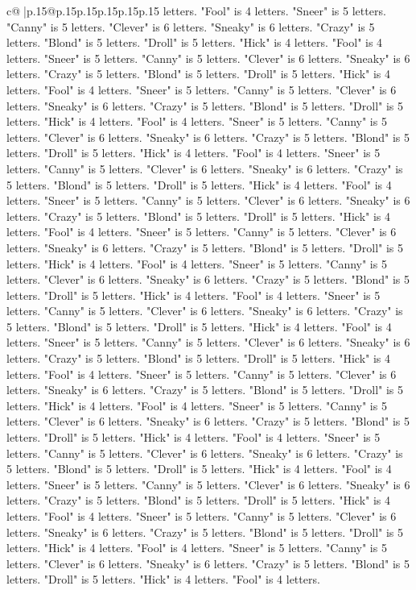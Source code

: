 \documentclass{article}
\begin{document}
{\begin{supertabular}{c@{$\;$}|p{.15\linewidth}@{}p{.15\linewidth}p{.15\linewidth}p{.15\linewidth}p{.15\linewidth}p{.15\linewidth}}
{{{letters. "Fool" is 4 letters. "Sneer" is 5 letters. "Canny" is 5 letters. "Clever" is 6 letters. "Sneaky" is 6 letters. "Crazy" is 5 letters. "Blond" is 5 letters. "Droll" is 5 letters. "Hick" is 4 letters. "Fool" is 4 letters. "Sneer" is 5 letters. "Canny" is 5 letters. "Clever" is 6 letters. "Sneaky" is 6 letters. "Crazy" is 5 letters. "Blond" is 5 letters. "Droll" is 5 letters. "Hick" is 4 letters. "Fool" is 4 letters. "Sneer" is 5 letters. "Canny" is 5 letters. "Clever" is 6 letters. "Sneaky" is 6 letters. "Crazy" is 5 letters. "Blond" is 5 letters. "Droll" is 5 letters. "Hick" is 4 letters. "Fool" is 4 letters. "Sneer" is 5 letters. "Canny" is 5 letters. "Clever" is 6 letters. "Sneaky" is 6 letters. "Crazy" is 5 letters. "Blond" is 5 letters. "Droll" is 5 letters. "Hick" is 4 letters. "Fool" is 4 letters. "Sneer" is 5 letters. "Canny" is 5 letters. "Clever" is 6 letters. "Sneaky" is 6 letters. "Crazy" is 5 letters. "Blond" is 5 letters. "Droll" is 5 letters. "Hick" is 4 letters. "Fool" is 4 letters. "Sneer" is 5 letters. "Canny" is 5 letters. "Clever" is 6 letters. "Sneaky" is 6 letters. "Crazy" is 5 letters. "Blond" is 5 letters. "Droll" is 5 letters. "Hick" is 4 letters. "Fool" is 4 letters. "Sneer" is 5 letters. "Canny" is 5 letters. "Clever" is 6 letters. "Sneaky" is 6 letters. "Crazy" is 5 letters. "Blond" is 5 letters. "Droll" is 5 letters. "Hick" is 4 letters. "Fool" is 4 letters. "Sneer" is 5 letters. "Canny" is 5 letters. "Clever" is 6 letters. "Sneaky" is 6 letters. "Crazy" is 5 letters. "Blond" is 5 letters. "Droll" is 5 letters. "Hick" is 4 letters. "Fool" is 4 letters. "Sneer" is 5 letters. "Canny" is 5 letters. "Clever" is 6 letters. "Sneaky" is 6 letters. "Crazy" is 5 letters. "Blond" is 5 letters. "Droll" is 5 letters. "Hick" is 4 letters. "Fool" is 4 letters. "Sneer" is 5 letters. "Canny" is 5 letters. "Clever" is 6 letters. "Sneaky" is 6 letters. "Crazy" is 5 letters. "Blond" is 5 letters. "Droll" is 5 letters. "Hick" is 4 letters. "Fool" is 4 letters. "Sneer" is 5 letters. "Canny" is 5 letters. "Clever" is 6 letters. "Sneaky" is 6 letters. "Crazy" is 5 letters. "Blond" is 5 letters. "Droll" is 5 letters. "Hick" is 4 letters. "Fool" is 4 letters. "Sneer" is 5 letters. "Canny" is 5 letters. "Clever" is 6 letters. "Sneaky" is 6 letters. "Crazy" is 5 letters. "Blond" is 5 letters. "Droll" is 5 letters. "Hick" is 4 letters. "Fool" is 4 letters. "Sneer" is 5 letters. "Canny" is 5 letters. "Clever" is 6 letters. "Sneaky" is 6 letters. "Crazy" is 5 letters. "Blond" is 5 letters. "Droll" is 5 letters. "Hick" is 4 letters. "Fool" is 4 letters. "Sneer" is 5 letters. "Canny" is 5 letters. "Clever" is 6 letters. "Sneaky" is 6 letters. "Crazy" is 5 letters. "Blond" is 5 letters. "Droll" is 5 letters. "Hick" is 4 letters. "Fool" is 4 letters. "Sneer" is 5 letters. "Canny" is 5 letters. "Clever" is 6 letters. "Sneaky" is 6 letters. "Crazy" is 5 letters. "Blond" is 5 letters. "Droll" is 5 letters. "Hick" is 4 letters. "Fool" is 4 letters. "Sneer" is 5 letters. "Canny" is 5 letters. "Clever" is 6 letters. "Sneaky" is 6 letters. "Crazy" is 5 letters. "Blond" is 5 letters. "Droll" is 5 letters. "Hick" is 4 letters. "Fool" is 4 letters. }}}
\end{supertabular}}
\end{document}
